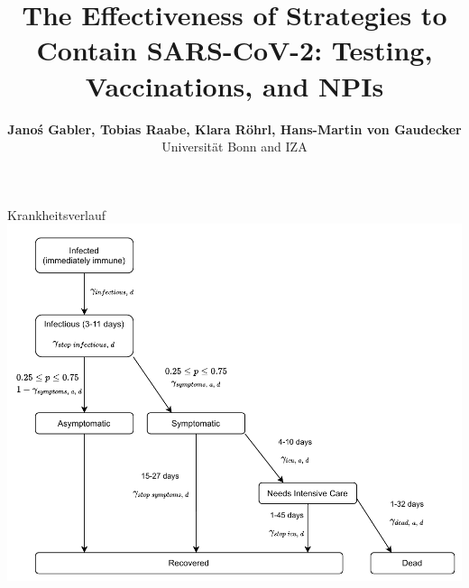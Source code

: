 \documentclass[11pt]{beamer}
\begin{document}
\title{The Effectiveness of Strategies to Contain SARS-CoV-2: Testing, Vaccinations, and NPIs}

\author[Janoś Gabler, Tobias Raabe, Klara Röhrl, Hans-Martin von Gaudecker]
{
{\bf Janoś Gabler, Tobias Raabe, Klara Röhrl, Hans-Martin von Gaudecker}\\
{\small Universität Bonn and IZA}\\[1ex]
}


\begin{frame}
    \titlepage
    \note{~}
\end{frame}




\begin{frame}{Krankheitsverlauf}
    \centering
    \includegraphics[width=\textwidth]{figures/model-graph-top-right}
\end{frame}
\end{document}
